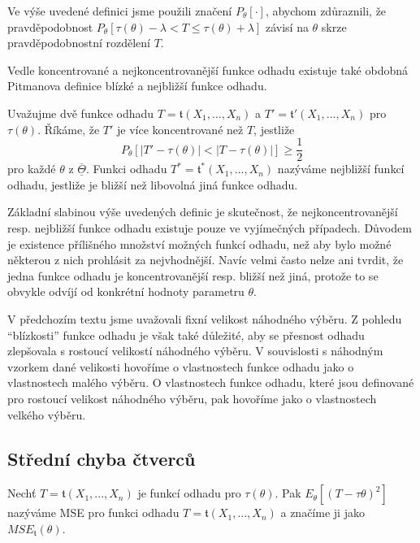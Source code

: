 Ve výše uvedené definici jsme použili značení $P_{\theta}[\cdot]$, abychom zdůraznili, že pravděpodobnost $P_{\theta}[\tau(\theta) - \lambda < T \le \tau(\theta) + \lambda]$ závisí na $\theta$ skrze pravděpodobnostní rozdělení $T$.

Vedle koncentrované a nejkoncentrovanější funkce odhadu existuje také obdobná Pitmanova definice blízké a nejbližší funkce odhadu.

\begin{definition}
Uvažujme dvě funkce odhadu $T = \mathfrak{t}(X_1, ..., X_n)$ a $T' = \mathfrak{t}'(X_1, ..., X_n)$ pro $\tau(\theta)$. Říkáme, že $T'$ je více koncentrované než $T$, jestliže
\begin{equation*}
P_{\theta}[|T' - \tau(\theta)| < |T - \tau(\theta)|] \ge \frac{1}{2}
\end{equation*}
pro každé $\theta$ z $\overline{\underline{\Theta}}$. Funkci odhadu $T^* = \mathfrak{t}^*(X_1, ..., X_n)$ nazýváme nejbližší funkcí odhadu, jestliže je bližší než libovolná jiná funkce odhadu.
\end{definition}

Základní slabinou výše uvedených definic je skutečnost, že nejkoncentrovanější resp. nejbližší funkce odhadu existuje pouze ve vyjímečných případech. Důvodem je existence přílišného množství možných funkcí odhadu, než aby bylo možné některou z nich prohlásit za nejvhodnější. Navíc velmi často nelze ani tvrdit, že jedna funkce  odhadu je koncentrovanější resp. bližší než jiná, protože to se obvykle odvíjí od konkrétní hodnoty parametru $\theta$.

V předchozím textu jsme uvažovali fixní velikost náhodného výběru. Z pohledu ``blízkosti'' funkce odhadu je však také důležité, aby se přesnost odhadu zlepšovala s rostoucí velikostí náhodného výběru. V souvislosti s náhodným vzorkem dané velikosti hovoříme o vlastnostech funkce odhadu jako o vlastnostech malého výběru. O vlastnostech funkce odhadu, které jsou definované pro rostoucí velikost náhodného výběru, pak hovoříme jako o vlastnostech velkého výběru.

\subsection{Střední chyba čtverců}

\begin{definition}
Nechť $T = \mathfrak{t}(X_1, ..., X_n)$ je funkcí odhadu pro $\tau(\theta)$. Pak $E_{\theta}[(T - \tau{\theta})^2]$ nazýváme MSE pro funkci odhadu $T = \mathfrak{t}(X_1, ..., X_n)$ a značíme ji jako $MSE_{\mathfrak{t}}(\theta)$.
\end{definition}

